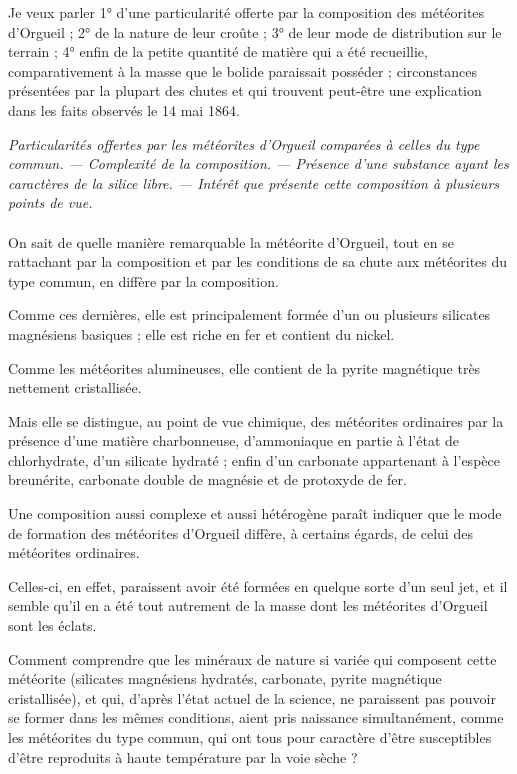 \documentclass[a4paper, 11pt, oneside, polutonikogreek, french]{article}
\begin{document}
Je veux parler 1° d'une particularité offerte par la composition des météorites d'Orgueil ; 2° de la nature de leur croûte ; 3° de leur mode de distribution sur le terrain ; 4° enfin de la petite quantité de matière qui a été recueillie, comparativement à la masse que le bolide paraissait posséder ; circonstances présentées par la plupart des chutes et qui trouvent peut-être une explication dans les faits observés le 14 mai 1864.
\clearpage
\begin{center}
\emph{Particularités offertes par les météorites d'Orgueil comparées à celles du type commun. --- Complexité de la composition. --- Présence d'une substance ayant les caractères de la silice libre. --- Intérêt que présente cette composition à plusieurs points de vue.}
\end{center}
\paragraph{}
On sait de quelle manière remarquable la météorite d'Orgueil, tout en se rattachant par la composition et par les conditions de sa chute aux météorites du type commun, en diffère par la composition.

Comme ces dernières, elle est principalement formée d'un ou plusieurs silicates magnésiens basiques ; elle est riche en fer et contient du nickel.

Comme les météorites alumineuses, elle contient de la pyrite magnétique très nettement cristallisée.

Mais elle se distingue, au point de vue chimique, des météorites ordinaires par la présence d'une matière charbonneuse, d'ammoniaque en partie à l'état de chlorhydrate, d'un silicate hydraté ; enfin d'un carbonate appartenant à l'espèce breunérite, carbonate double de magnésie et de protoxyde de fer.

Une composition aussi complexe et aussi hétérogène paraît indiquer que le mode de formation des météorites d'Orgueil diffère, à certains égards, de celui des météorites ordinaires.

Celles-ci, en effet, paraissent avoir été formées en quelque sorte d'un seul jet, et il semble qu'il en a été tout autrement de la masse dont les météorites d'Orgueil sont les éclats.

Comment comprendre que les minéraux de nature si variée qui composent cette météorite (silicates magnésiens hydratés, carbonate, pyrite magnétique cristallisée), et qui, d'après l'état actuel de la science, ne paraissent pas pouvoir se former dans les mêmes conditions, aient pris naissance simultanément, comme les météorites du type commun, qui ont tous pour caractère d'être susceptibles d'être reproduits à haute température par la voie sèche ?
\end{document}
